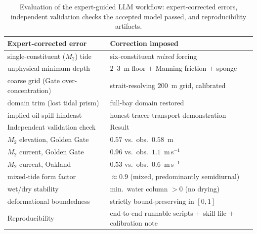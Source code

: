 \documentclass[Journal]{ascelike}   %
\begin{document}
\begin{table}[t]\centering
\caption{Evaluation of the expert-guided LLM workflow: expert-corrected errors,
independent validation checks the accepted model passed, and reproducibility artifacts.}
\label{tab:workflow}
\begin{tabular}{ll}
\toprule
Expert-corrected error & Correction imposed \\
\midrule
single-constituent ($M_2$) tide      & six-constituent \emph{mixed} forcing \\
unphysical minimum depth             & $2$--$3$~m floor $+$ Manning friction $+$ sponge \\
coarse grid (Gate over-concentration)& strait-resolving $200$~m grid, calibrated \\
domain trim (lost tidal prism)       & full-bay domain restored \\
implied oil-spill hindcast           & honest tracer-transport demonstration \\
\midrule
Independent validation check & Result \\
\midrule
$M_2$ elevation, Golden Gate & $0.57$ vs.\ obs.\ $0.58$~m \\
$M_2$ current, Golden Gate   & $0.96$ vs.\ obs.\ $1.1$~m\,s$^{-1}$ \\
$M_2$ current, Oakland       & $0.53$ vs.\ obs.\ $0.6$~m\,s$^{-1}$ \\
mixed-tide form factor       & $\approx0.9$ (mixed, predominantly semidiurnal) \\
wet/dry stability            & min.\ water column $>0$ (no drying) \\
deformational boundedness    & strictly bound-preserving in $[0,1]$ \\
\midrule
Reproducibility & end-to-end runnable scripts $+$ skill file $+$ calibration note \\
\bottomrule
\end{tabular}
\end{table}
\end{document}
